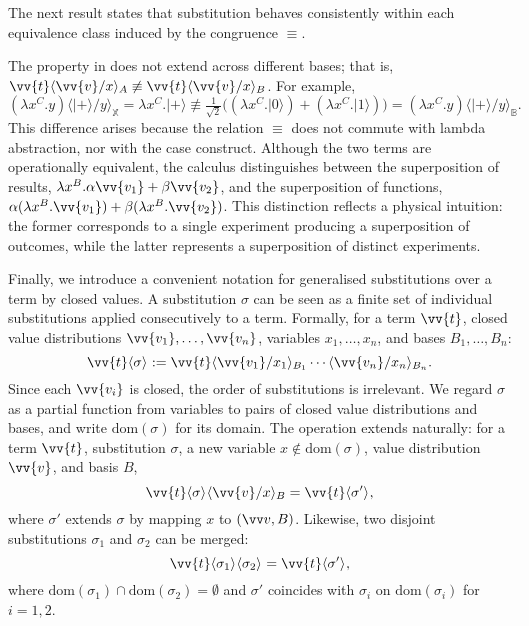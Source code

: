 \documentclass[runningheads,orivec,envcountsame,envcountsect]{llncs}
\providecommand{\qed}{\hbox{\rule{1ex}{1ex}}}%
\newcommand\ket[1]{\ensuremath{|#1\rangle}}
\newcommand\ansubst[2]{\ensuremath{\langle #1 \rangle_{#2}}}
\newcommand\dom[1]{\mathrm{dom}(#1)}
\def\Lam#1#2#3{\lambda#1^{#2}{.}#3} %
\newcommand\B{\mathbb B}
\newcommand\XB{\mathbb X}
\begin{document}
The next result states that substitution behaves consistently within each
equivalence class induced by the congruence $\equiv$.


\begin{remark}
  The property in  does not extend across
  different bases; that is,
  $\vv{t}\ansubst{\vv{v}/x}{A}\not\equiv\vv{t}\ansubst{\vv{v}/x}{B}$.
  For example,
  \[
    (\Lam{x}{C}{y})\ansubst{\ket{+}/y}{\XB}
    = \Lam{x}{C}{\ket{+}} 
    \not\equiv
    \tfrac{1}{\sqrt{2}}\big((\Lam{x}{C}{\ket{0}})
    + (\Lam{x}{C}{\ket{1}})\big)
    = (\Lam{x}{C}{y})\ansubst{\ket{+}/y}{\B}.
  \]
  This difference arises because the relation $\equiv$ does not commute with
  lambda abstraction, nor with the case construct. Although the two terms are
  operationally equivalent, the calculus distinguishes between the
  superposition of results,
  $\Lam{x}{B}{\alpha\vv{v_1} + \beta\vv{v_2}}$,
  and the superposition of functions,
  $\alpha(\Lam{x}{B}{\vv{v_1}}) + \beta(\Lam{x}{B}{\vv{v_2}})$.
  This distinction reflects a physical intuition: the former corresponds to a
  single experiment producing a superposition of outcomes, while the latter
  represents a superposition of distinct experiments.
\end{remark}

Finally, we introduce a convenient notation for generalised substitutions over
a term by closed values. A substitution $\sigma$ can be seen as a finite set of
individual substitutions applied consecutively to a term. Formally, for a term
$\vv{t}$, closed value distributions $\vv{v_1},\dots,\vv{v_n}$, variables
$x_1,\dots,x_n$, and bases $B_1,\dots,B_n$:
\[
  \vv{t}\ansubst{\sigma}{}
  := \vv{t}\ansubst{\vv{v_1}/x_1}{B_1}\dotsb\ansubst{\vv{v_n}/x_n}{B_n}.
\]
Since each $\vv{v_i}$ is closed, the order of substitutions is irrelevant. We
regard $\sigma$ as a partial function from variables to pairs of closed value
distributions and bases, and write $\dom{\sigma}$ for its domain. The operation
extends naturally: for a term $\vv{t}$, substitution $\sigma$, a new variable
$x\notin\dom{\sigma}$, value distribution $\vv{v}$, and basis $B$,
\[
  \vv{t}\ansubst{\sigma}{}\ansubst{\vv{v}/x}{B}
  = \vv{t}\ansubst{\sigma'}{},
\]
where $\sigma'$ extends $\sigma$ by mapping $x$ to $(\vv v,B)$. Likewise, two
disjoint substitutions $\sigma_1$ and $\sigma_2$ can be merged:
\[
  \vv{t}\ansubst{\sigma_1}{}\ansubst{\sigma_2}{}
  = \vv{t}\ansubst{\sigma'}{},
\]
where $\dom{\sigma_1}\cap\dom{\sigma_2}=\emptyset$ and $\sigma'$ coincides with
$\sigma_i$ on $\dom{\sigma_i}$ for $i=1,2$.
\end{document}
